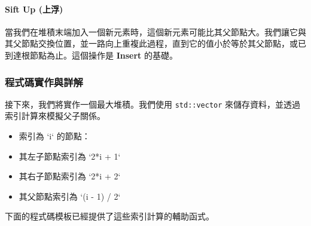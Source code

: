 \paragraph{Sift Up (上浮)}
當我們在堆積末端加入一個新元素時，這個新元素可能比其父節點大。我們讓它與其父節點交換位置，並一路向上重複此過程，直到它的值小於等於其父節點，或已到達根節點為止。這個操作是 \textbf{Insert} 的基礎。

\subsubsection*{程式碼實作與詳解}

接下來，我們將實作一個最大堆積。我們使用 \verb|std::vector| 來儲存資料，並透過索引計算來模擬父子關係。

\begin{itemize}
    \item 索引為 `i` 的節點：
    \item 其左子節點索引為 `2*i + 1`
    \item 其右子節點索引為 `2*i + 2`
    \item 其父節點索引為 `(i - 1) / 2`
\end{itemize}
下面的程式碼模板已經提供了這些索引計算的輔助函式。

